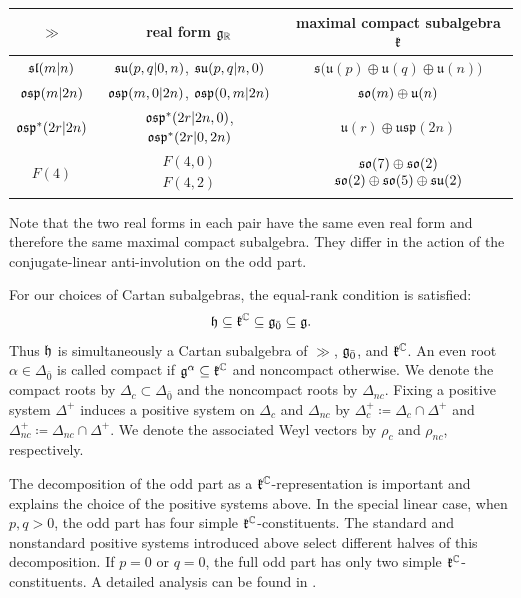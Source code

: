 \begin{table}[ht]
\centering
\begin{tabular}{|c|c|c|}
\hline
$\gg$ & real form $\gg_{\RR}$ & maximal compact subalgebra $\kk$ \\
\hline
$\sl(m\vert n)$
&
$\su(p,q\vert 0,n)$, $\su(p,q\vert n,0)$
&
$\mathfrak{s}\bigl(
\mathfrak{u}(p)\oplus
\mathfrak{u}(q)\oplus
\mathfrak{u}(n)
\bigr)$
\\
\hline
$\osp(m\vert 2n)$
&
$\osp(m,0\vert 2n)$, $\osp(0,m\vert 2n)$
&
$\so(m)\oplus\mathfrak{u}(n)$
\\
\hline
$\osp^{\ast}(2r\vert 2n)$
&
$\osp^{\ast}(2r\vert 2n,0)$,
$\osp^{\ast}(2r\vert 0,2n)$
&
$\mathfrak{u}(r)\oplus\mathfrak{usp}(2n)$
\\
\hline
$F(4)$
&
$\begin{array}{c}
F(4,0)\\
F(4,2)
\end{array}$
&
$\begin{array}{c}
\so(7)\oplus\mathfrak{so}(2)\\
\mathfrak{so}(2)\oplus\mathfrak{so}(5)\oplus\su(2)
\end{array}$
\\
\hline
\end{tabular}
\end{table}
\noindent
Note that the two real forms in each pair have the same even real form and therefore the same maximal compact subalgebra. They differ in the action of the conjugate-linear anti-involution on the odd part.

For our choices of Cartan subalgebras, the equal-rank condition is satisfied:
\begin{equation}
\hh\subseteq\kk^{\CC}\subseteq\even\subseteq\gg.
\end{equation}
Thus $\hh$ is simultaneously a Cartan subalgebra of $\gg$, $\even$, and $\kk^{\CC}$. An even root $\alpha\in\Delta_{\bar0}$ is called compact if $\gg^\alpha\subseteq\kk^{\CC}$ and noncompact otherwise. We denote the compact roots by $\Delta_{c} \subset \Delta_{\bar{0}}$ and the noncompact roots by $\Delta_{nc}$. Fixing a positive system $\Delta^{+}$ induces a positive system on $\Delta_{c}$ and $\Delta_{nc}$ by $\Delta_{c}^{+} \coloneqq \Delta_{c}\cap \Delta^{+}$ and $\Delta_{nc}^{+} \coloneqq \Delta_{nc}\cap \Delta^{+}$. We denote the associated Weyl vectors by $\rho_{c}$ and $\rho_{nc}$, respectively. 

The decomposition of the odd part as a $\kk^{\CC}$-representation is important and explains the choice of the positive systems above. In the special linear case, when $p,q>0$, the odd part has four simple $\kk^{\CC}$-constituents. The standard and nonstandard positive systems introduced above select different halves of this decomposition. If $p=0$ or $q=0$, the full odd part has only two simple $\kk^{\CC}$-constituents. A detailed analysis can be found in \cite{SchmidtDirac}.

